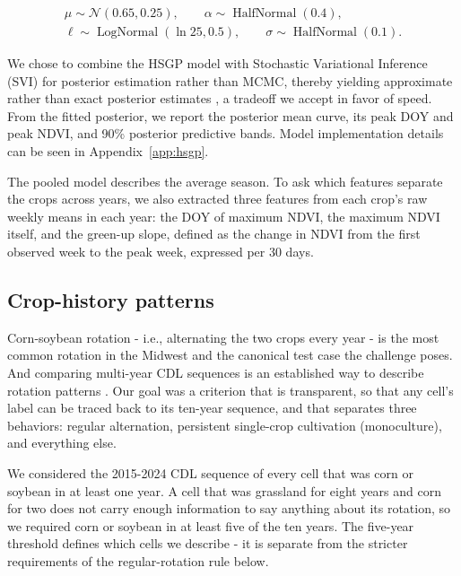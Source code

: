 \documentclass[10pt,letterpaper]{article}
\begin{document}
\begin{equation}
\begin{gathered}
\mu\sim\mathcal{N}(0.65,0.25),\qquad \alpha\sim\operatorname{HalfNormal}(0.4),\\
\ell\sim\operatorname{LogNormal}(\ln25,0.5),\qquad \sigma\sim\operatorname{HalfNormal}(0.1).
\end{gathered}
\label{eq:priors}
\end{equation}

We chose to combine the HSGP model with Stochastic Variational Inference (SVI) for posterior estimation rather than MCMC, thereby yielding approximate rather than exact posterior estimates \citep{blei2017vi}, a tradeoff we accept in favor of speed. From the fitted posterior, we report the posterior mean curve, its peak DOY and peak NDVI, and 90\% posterior predictive bands. Model implementation details can be seen in Appendix~\ref{app:hsgp}.

The pooled model describes the average season. To ask which features separate the crops across years, we also extracted three features from each crop's raw weekly means in each year: the DOY of maximum NDVI, the maximum NDVI itself, and the green-up slope, defined as the change in NDVI from the first observed week to the peak week, expressed per 30 days.

\subsection{Crop-history patterns}\label{sec:method-rotation}

Corn-soybean rotation - i.e., alternating the two crops every year - is the most common rotation in the Midwest and the canonical test case the challenge poses. And comparing multi-year CDL sequences is an established way to describe rotation patterns \citep{sahajpal2014recruit}. Our goal was a criterion that is transparent, so that any cell's label can be traced back to its ten-year sequence, and that separates three behaviors: regular alternation, persistent single-crop cultivation (monoculture), and everything else.

We considered the 2015-2024 CDL sequence of every cell that was corn or soybean in at least one year. A cell that was grassland for eight years and corn for two does not carry enough information to say anything about its rotation, so we required corn or soybean in at least five of the ten years. The five-year threshold defines which cells we describe - it is separate from the stricter requirements of the regular-rotation rule below.
\end{document}
